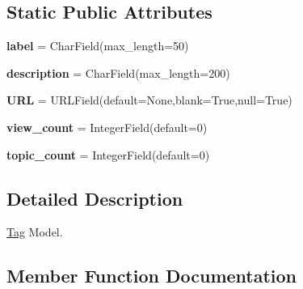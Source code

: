 \subsection*{Static Public Attributes}
\begin{DoxyCompactItemize}
\item 
\hypertarget{class_meanco_app_1_1models_1_1tag_1_1_tag_ae63d76c0e5b9debb31fadc32b9495683}{}\label{class_meanco_app_1_1models_1_1tag_1_1_tag_ae63d76c0e5b9debb31fadc32b9495683} 
{\bfseries label} = Char\+Field(max\+\_\+length=50)
\item 
\hypertarget{class_meanco_app_1_1models_1_1tag_1_1_tag_a9bb4bcfe1d782fbfdf090b3bf0515021}{}\label{class_meanco_app_1_1models_1_1tag_1_1_tag_a9bb4bcfe1d782fbfdf090b3bf0515021} 
{\bfseries description} = Char\+Field(max\+\_\+length=200)
\item 
\hypertarget{class_meanco_app_1_1models_1_1tag_1_1_tag_ad0c5d6fa94930390babd68c18a27eb1f}{}\label{class_meanco_app_1_1models_1_1tag_1_1_tag_ad0c5d6fa94930390babd68c18a27eb1f} 
{\bfseries U\+RL} = U\+R\+L\+Field(default=None,blank=True,null=True)
\item 
\hypertarget{class_meanco_app_1_1models_1_1tag_1_1_tag_a7b90edb4d795be92373cd6511c460f40}{}\label{class_meanco_app_1_1models_1_1tag_1_1_tag_a7b90edb4d795be92373cd6511c460f40} 
{\bfseries view\+\_\+count} = Integer\+Field(default=0)
\item 
\hypertarget{class_meanco_app_1_1models_1_1tag_1_1_tag_a75fd4da7197a9b7544a02a20786165b0}{}\label{class_meanco_app_1_1models_1_1tag_1_1_tag_a75fd4da7197a9b7544a02a20786165b0} 
{\bfseries topic\+\_\+count} = Integer\+Field(default=0)
\end{DoxyCompactItemize}


\subsection{Detailed Description}
\hyperlink{class_meanco_app_1_1models_1_1tag_1_1_tag}{Tag} Model. 

\subsection{Member Function Documentation}
\hypertarget{class_meanco_app_1_1models_1_1tag_1_1_tag_a78431fe5802b73e1adef412f7f47d5b0}{}\label{class_meanco_app_1_1models_1_1tag_1_1_tag_a78431fe5802b73e1adef412f7f47d5b0} 

